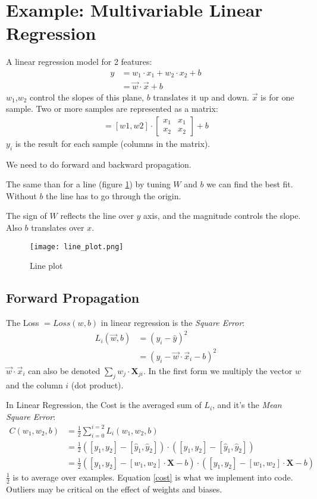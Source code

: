\section{Example: Multivariable Linear Regression}
A linear regression model for 2 features:
\begin{align*}
 y &= w_1\cdot x_1 + w_2\cdot x_2 + b \\
   &= \vec{w}\cdot\vec{x} + b
\end{align*}
$w_1$,$w_2$ control the slopes of this plane, $b$ translates it up and down. $\vec{x}$ is for one sample. Two or more samples are represented as a matrix:
\begin{align}
[y1, y2] = 
  [w1, w2]\cdot{}
  \begin{bmatrix}
  x_1 & x_1\\
  x_2 & x_2 
  \end{bmatrix}
 +  b
\end{align}
$y_i$ is the result for each sample (columns in the matrix).

We need to do forward and backward propagation.

The same than for a line (figure \ref{fig:line}) by tuning $W$ and $b$  we can find the best fit. Without $b$ the line has to go through the origin. 

The sign of $W$ reflects the line over $y$ axis, and the magnitude controls the slope. Also $b$ translates over $x$.

\begin{figure}[h]
 \centering
 \texttt{[image: line\_plot.png]}
  \caption{Line plot} \label{fig:line}
\end{figure}


\subsection{Forward Propagation}
The Loss $= Loss(w,b)$ in linear regression is the \textit{Square Error}:
\begin{align*}
  L_i(\vec{w}, b) &= (y_i - \hat{y})^2\\
  &=(y_i -\vec{w}\cdot{}\vec{x}_{i} -b)^2
\end{align*}
$\vec{w}\cdot{}\vec{x}_i$ can also be denoted $\sum_jw_j\cdot{}\mathbf{X}_{ji}$. In the first form we multiply the vector $w$ and the column $i$ (dot product).

In Linear Regression, the Cost is the averaged sum of $L_i$, and it's the \textit{Mean Square Error}:
\begin{align}
  C(w_1, w_2, b) &= \frac{1}{2} \sum_{i=0}^{i=2} L_i(w_1, w_2, b)\\
  &= \frac{1}{2}([y_1, y_2] - [\hat{y}_1, \hat{y}_2])\cdot{}([y_1, y_2]-[\hat{y}_1, \hat{y}_2])\\
  &=\frac{1}{2}([y_1, y_2] - [w_1, w_2]\cdot{}\mathbf{X}-b)\cdot{}([y_1, y_2] - [w_1,w_2]\cdot{}\mathbf{X} -b) \label{cost}
\end{align}
$\frac{1}{2}$ is to average over examples. Equation \ref{cost} is what we implement into code.
Outliers may be critical on the effect of weights and biases.

